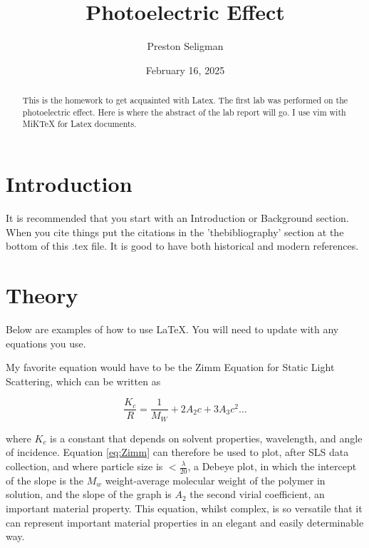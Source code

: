 \documentclass[aps,prb,twocolumn,groupedaddress,nofootinbib,floatfix]{revtex4}
\begin{document}
\title{Photoelectric Effect}
\author{Preston Seligman}




\date{February 16, 2025}

\begin{abstract} \noindent This is the homework to get acquainted with Latex. The first lab was performed on the photoelectric effect. Here is where the abstract of the lab report will go. I use vim with MiKTeX for Latex documents. 
\end{abstract}

\maketitle

\section*{Introduction}

It is recommended that you start with an Introduction or Background
section.  When you cite things \cite{Emissivity} put the citations in the 'thebibliography' section at the bottom of this .tex file.   It is good to have both historical and modern references.



\section*{Theory}


Below are examples of how to use LaTeX.  You will need to update with any equations you use.

My favorite equation would have to be the Zimm Equation for Static Light Scattering, which can be written as


\begin{equation}
\frac{K_{c}}{R}=\frac{1}{M_{W}}+2A_{2}c+3A_{3}c^2\ldots
\label{eq:Zimm}
\end{equation}

where $K_{c}$ is a constant that depends on solvent properties, wavelength, and angle of incidence. Equation \ref{eq:Zimm} can therefore be used to plot, after SLS data collection, and where particle size is $<\frac{\lambda}{20}$, a Debeye plot, in which the intercept of the slope is the $M_{w}$ weight-average molecular weight of the polymer in solution, and the slope of the graph is $A_{2}$ the second virial coefficient, an important material property. This equation, whilst complex, is so versatile that it can represent important material properties in an elegant and easily determinable way.
\end{document}
